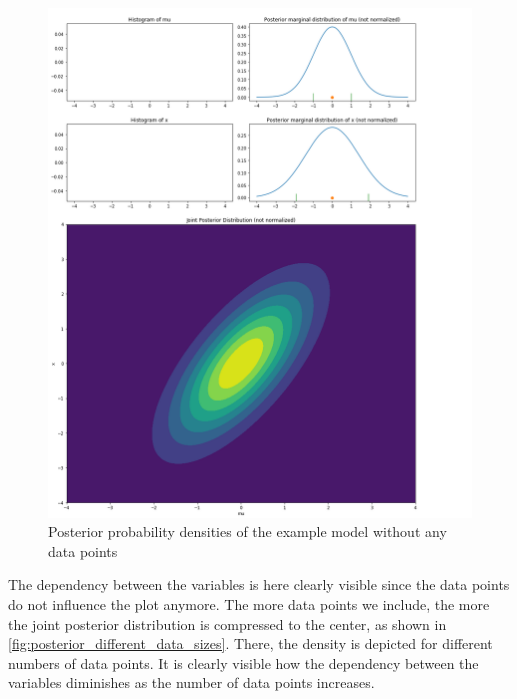 \documentclass{article}
\begin{document}
\begin{figure}
	\includegraphics[width=\textwidth]{images/ground_truth_posterior_5_cut.png}
	\caption[Posterior probability densities of the example model without any data points]{Posterior probability densities of the example model without any data points}
	\label{fig:ground_truth_posterior_5}
\end{figure}
The dependency between the variables is here clearly visible since the data points do not influence the plot anymore. The more data points we include, the more the joint posterior distribution is compressed to the center, as shown in \autoref{fig:posterior_different_data_sizes}. There, the density is depicted for different numbers of data points. It is clearly visible how the dependency between the variables diminishes as the number of data points increases.
\end{document}
